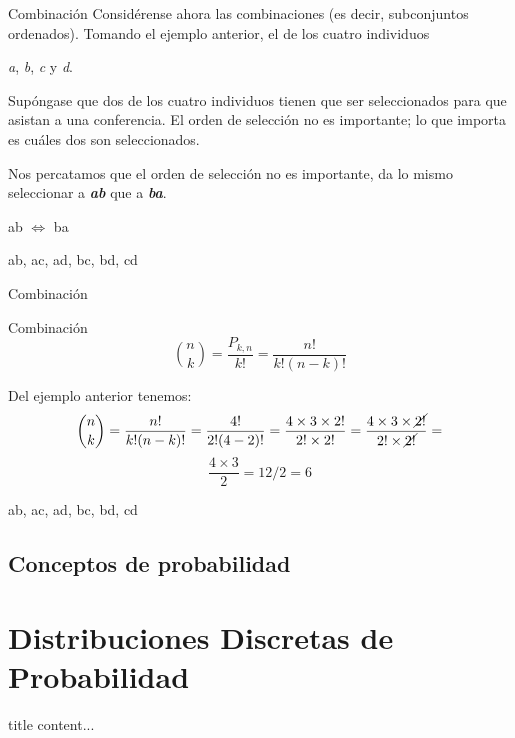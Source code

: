 \documentclass[11pt]{beamer}
\begin{document}
         \begin{frame}{Combinación}
            Considérense ahora las combinaciones (es decir, subconjuntos ordenados). Tomando el ejemplo anterior, el de los cuatro individuos\\ \begin{center}
                 \textit{a}, \textit{b}, \textit{c} y \textit{d}.
             \end{center}
             Supóngase que dos de los cuatro individuos tienen que ser seleccionados para que asistan a una conferencia. El orden de selección no es importante; lo que importa es cuáles dos son seleccionados.

             Nos percatamos que el orden de selección no es importante, da lo mismo seleccionar a \textit{\textbf{ab}} que a \textit{\textbf{ba}}.
             \begin{center}
                 ab $\Leftrightarrow$ ba
             \end{center}
             \begin{center}
                 ab, ac, ad, bc, bd, cd
             \end{center}
         \end{frame}

         \begin{frame}{Combinación}
             \begin{block}{Combinación}
               $$\binom{n}{k} = \dfrac{P_{k,n}}{k!} = \dfrac{n!}{k!(n-k)!} $$
             \end{block}
             Del ejemplo anterior tenemos:
             $$\binom{n}{k} = \dfrac{n!}{k!(n-k)!} = \dfrac{4!}{2!(4-2)!}= \dfrac{4 \times 3 \times 2!}{2! \times 2!}=\dfrac{4 \times 3 \times \cancel{2!}}{2! \times \cancel{2!}}=$$
             $$\dfrac{4 \times 3}{2} = 12/2 = 6$$
             \pause

             \begin{center}
                 ab, ac, ad, bc, bd, cd
             \end{center}
         \end{frame}


      \subsection*{Conceptos de probabilidad}

    \section*{Distribuciones Discretas de Probabilidad}
    \begin{frame}{title}
        content...
    \end{frame}
\end{document}
